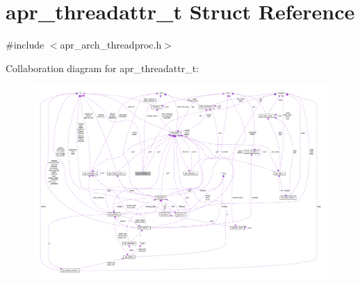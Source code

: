 \hypertarget{structapr__threadattr__t}{}\section{apr\+\_\+threadattr\+\_\+t Struct Reference}
\label{structapr__threadattr__t}


{\ttfamily \#include $<$apr\+\_\+arch\+\_\+threadproc.\+h$>$}



Collaboration diagram for apr\+\_\+threadattr\+\_\+t\+:
\nopagebreak
\begin{figure}[H]
\begin{center}
\leavevmode
\includegraphics[width=350pt]{structapr__threadattr__t__coll__graph}
\end{center}
\end{figure}
